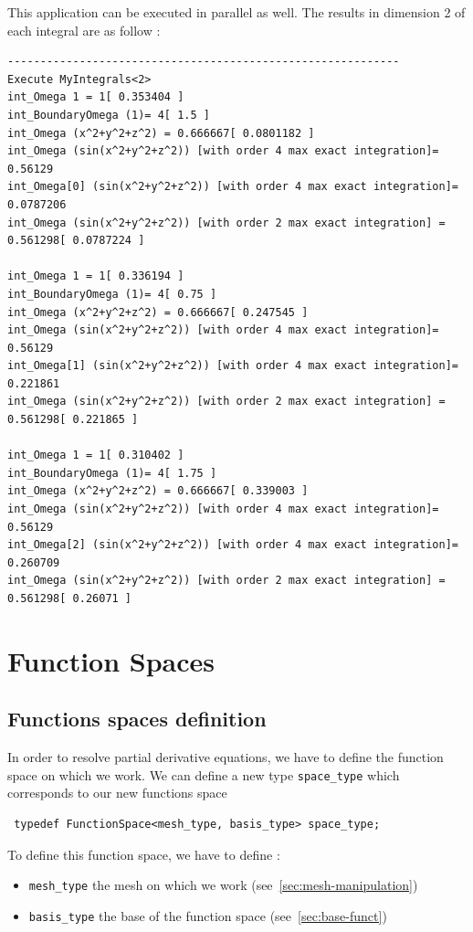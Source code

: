 This application can be executed in parallel as well. The results in dimension 2 of each integral are as follow :
\begin{lstlisting}
------------------------------------------------------------
Execute MyIntegrals<2>
int_Omega 1 = 1[ 0.353404 ]
int_BoundaryOmega (1)= 4[ 1.5 ]
int_Omega (x^2+y^2+z^2) = 0.666667[ 0.0801182 ]
int_Omega (sin(x^2+y^2+z^2)) [with order 4 max exact integration]= 0.56129
int_Omega[0] (sin(x^2+y^2+z^2)) [with order 4 max exact integration]= 0.0787206
int_Omega (sin(x^2+y^2+z^2)) [with order 2 max exact integration] = 0.561298[ 0.0787224 ]

int_Omega 1 = 1[ 0.336194 ]
int_BoundaryOmega (1)= 4[ 0.75 ]
int_Omega (x^2+y^2+z^2) = 0.666667[ 0.247545 ]
int_Omega (sin(x^2+y^2+z^2)) [with order 4 max exact integration]= 0.56129
int_Omega[1] (sin(x^2+y^2+z^2)) [with order 4 max exact integration]= 0.221861
int_Omega (sin(x^2+y^2+z^2)) [with order 2 max exact integration] = 0.561298[ 0.221865 ]

int_Omega 1 = 1[ 0.310402 ]
int_BoundaryOmega (1)= 4[ 1.75 ]
int_Omega (x^2+y^2+z^2) = 0.666667[ 0.339003 ]
int_Omega (sin(x^2+y^2+z^2)) [with order 4 max exact integration]= 0.56129
int_Omega[2] (sin(x^2+y^2+z^2)) [with order 4 max exact integration]= 0.260709
int_Omega (sin(x^2+y^2+z^2)) [with order 2 max exact integration] = 0.561298[ 0.26071 ]
\end{lstlisting}



\section{Function Spaces}

\label{sec:func-spaces}

\subsection{Functions spaces definition}

In order to resolve partial derivative equations, we have to define the function space on which we work.
We can define a new type \lstinline!space_type! which corresponds to our new functions space
\begin{lstlisting}
 typedef FunctionSpace<mesh_type, basis_type> space_type;
\end{lstlisting}
To define this function space, we have to define :
\begin{itemize}
 \item \lstinline!mesh_type! the mesh on which we work (see~\ref{sec:mesh-manipulation})
 \item \lstinline!basis_type! the base of the function space (see~\ref{sec:base-funct})
\end{itemize}


